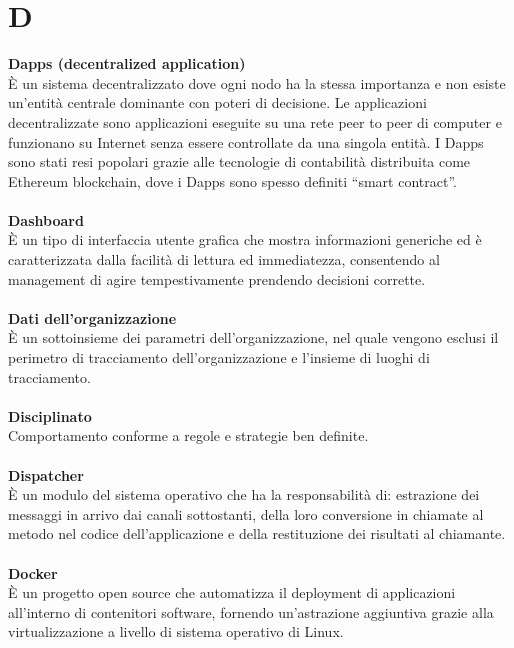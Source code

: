\section{D}
\textbf{Dapps (decentralized application)}\\
È un sistema decentralizzato dove ogni nodo ha la stessa importanza e non esiste un'entità centrale dominante con poteri di decisione. Le applicazioni decentralizzate sono applicazioni eseguite su una rete peer to peer di computer e funzionano su Internet senza essere controllate da una singola entità. I Dapps sono stati resi popolari grazie alle tecnologie di contabilità distribuita come Ethereum blockchain, dove i Dapps sono spesso definiti “smart contract”. \\ \\
\textbf{Dashboard}\\
È un tipo di interfaccia utente grafica che mostra informazioni generiche ed è caratterizzata dalla facilità di lettura ed immediatezza, consentendo al management di agire tempestivamente prendendo decisioni corrette. \\ \\
\textbf{Dati dell'organizzazione}\\
È un sottoinsieme dei parametri dell'organizzazione, nel quale vengono esclusi il perimetro di tracciamento dell'organizzazione e l'insieme di luoghi di tracciamento. \\ \\
\textbf{Disciplinato}\\
Comportamento conforme a regole e strategie ben definite. \\ \\
\textbf{Dispatcher}\\
È un modulo del sistema operativo che ha la responsabilità di: estrazione dei messaggi in arrivo dai canali sottostanti, della loro conversione in chiamate al metodo nel codice dell'applicazione e della restituzione dei risultati al chiamante. \\ \\
\textbf{Docker}\\
È un progetto open source che automatizza il deployment di applicazioni all'interno di contenitori software, fornendo un'astrazione aggiuntiva grazie alla virtualizzazione a livello di sistema operativo di Linux. \\ \\
\clearpage